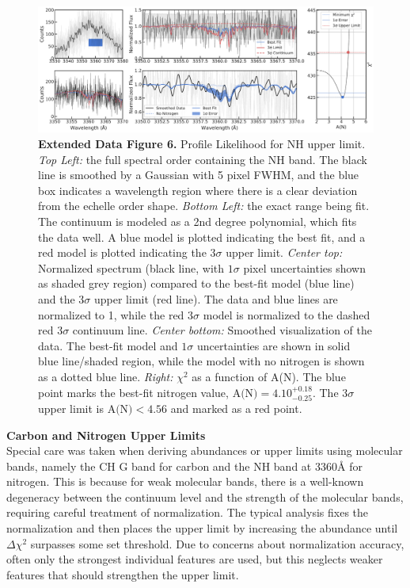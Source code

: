\documentclass{natureprintstyle}
\begin{document}
\begin{figure}
    \centering
    \includegraphics[width=\linewidth]{NFe_profilelikelihood.pdf}
    \caption{\textbf{Extended Data Figure 6.} Profile Likelihood for NH upper limit. \textit{Top Left:} the full spectral order containing the NH band. The black line is smoothed by a Gaussian with 5 pixel FWHM, and the blue box indicates a wavelength region where there is a clear deviation from the echelle order shape.
    \textit{Bottom Left:} the exact range being fit. The continuum is modeled as a 2nd degree polynomial, which fits the data well.
    A blue model is plotted indicating the best fit, and a red model is plotted indicating the $3\sigma$ upper limit.
    \textit{Center top:} Normalized spectrum (black line, with $1\sigma$ pixel uncertainties shown as shaded grey region)
    compared to the best-fit model (blue line) and the 3$\sigma$ upper limit (red line).
    The data and blue lines are normalized to 1, while the red $3\sigma$ model is normalized to the dashed red $3\sigma$ continuum line.
    \textit{Center bottom:} Smoothed visualization of the data. The best-fit model and $1\sigma$ uncertainties are shown in solid blue line/shaded region, while the model with no nitrogen is shown as a dotted blue line.
    \textit{Right:} $\chi^2$ as a function of A(N).
    The blue point marks the best-fit nitrogen value, $\mbox{A(N)} = 4.10^{+0.18}_{-0.25}$.
    The $3\sigma$ upper limit is $\mbox{A(N)} < 4.56$ and marked as a red point.}
    \label{fig:nhsynth}
\end{figure}

\vspace{1mm}
\noindent
{\bf Carbon and Nitrogen Upper Limits}
\\
\noindent
Special care was taken when deriving abundances or upper limits using molecular bands, namely the CH G band for carbon and the NH band at 3360{\AA} for nitrogen.
This is because for weak molecular bands, there is a well-known degeneracy between the continuum level and the strength of the molecular bands\cite{Caffau2024}, requiring careful treatment of normalization.
The typical analysis fixes the normalization and then places the upper limit by increasing the abundance until $\Delta \chi^2$ surpasses some set threshold\cite{Ji2020b, Lagae2023}.
Due to concerns about normalization accuracy, often only the strongest individual features are used\cite{Caffau2024}, but this neglects weaker features that should strengthen the upper limit.
\end{document}

